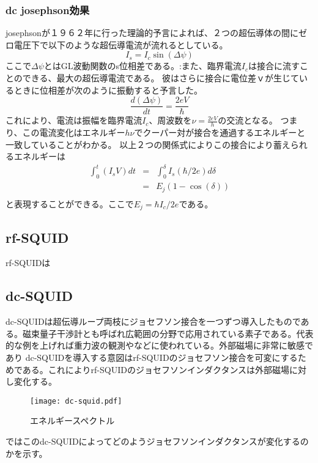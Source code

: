             \subsubsection{dc josephson効果}
                josephsonが１９６２年に行った理論的予言によれば、２つの超伝導体の間にゼロ電圧下で以下のような超伝導電流が流れるとしている。
                \begin{equation*}
                    I_s = I_c \sin(\Delta \psi)
                \end{equation*}
                ここで$\Delta \psi$とはGL波動関数のs位相差である。:また、臨界電流$I_c$は接合に流すことのできる、最大の超伝導電流である。
                彼はさらに接合に電位差ｖが生じているときに位相差が次のように振動すると予言した。
                \begin{equation*}
                    \frac{d(\Delta \psi)}{dt} = \frac{2eV}{\hbar}
                \end{equation*}
                これにより、電流は振幅を臨界電流$I_c$、周波数を$\nu = \frac{2eV}{h}$の交流となる。
                つまり、この電流変化はエネルギー$h\nu$でクーパー対が接合を通過するエネルギーと一致していることがわかる。
                以上２つの関係式によりこの接合により蓄えられるエネルギーは
                \begin{eqnarray}
                    \int_0^{t} (I_s V)dt&=&\int_{0}^{\delta} I_s(\hbar/2e)d\delta\\
                    &=&E_j(1-\cos(\delta))\\
                \end{eqnarray}
                と表現することができる。ここで$E_j=\hbar I_c/2e$である。
    \subsection{rf-SQUID}
                rf-SQUIDは
    \subsection{dc-SQUID}
        dc-SQUIDは超伝導ループ両枝にジョセフソン接合を一つずつ導入したものである。磁束量子干渉計とも呼ばれ広範囲の分野で応用されている素子である。代表的な例を上げれば重力波の観測やなどに使われている。外部磁場に非常に敏感であり
        dc-SQUIDを導入する意図はrf-SQUIDのジョセフソン接合を可変にするためである。これによりrf-SQUIDのジョセフソンインダクタンスは外部磁場に対し変化する。
        \begin{figure}[H]
            \centering
            \texttt{[image: dc-squid.pdf]}
            \caption{エネルギースペクトル}
        \end{figure}
        ではこのdc-SQUIDによってどのようジョセフソンインダクタンスが変化するのかを示す。
